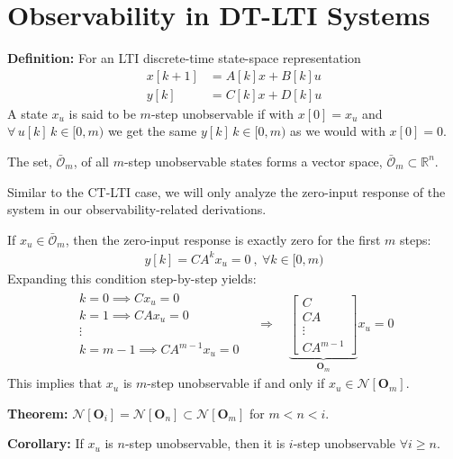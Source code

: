 \documentclass[twoside]{article}
\begin{document}
\section{Observability in DT-LTI Systems}

\textbf{Definition:} For an LTI discrete-time state-space representation
%
\begin{align*}
  x[k+1] &= A[k] x + B[k] u
\\
  y[k] &= C[k] x + D[k] u
\end{align*}
%
A state $x_u$ is said to be $m$-step unobservable 
if with $x[0] = x_u$ and $\forall \, u[k] \, k \in [0,m)$ we get the same $y[k] \, k \in [0,m)$ as we would with $x[0] = 0$. 

The set, $\bar{\mathcal{O}}_m$, of all $m$-step unobservable states forms a vector space, $\bar{\mathcal{O}}_m \subset 
\mathbb{R}^n$.

Similar to the CT-LTI case, we will only analyze the zero-input response of the system in our 
observability-related derivations. 

If $x_u \in \bar{\mathcal{O}}_m$, then the zero-input response is exactly zero for the first $m$ steps:
%
\begin{align*}
    y[k] = C A^k x_u = 0 \ , \ \forall k \in [0,m)
\end{align*}
%
Expanding this condition step-by-step yields:
%
\begin{align*}
    \begin{array}{c} 
        k = 0 \implies C x_u = 0 \\
        k = 1 \implies C A x_u = 0 \\
        \vdots \\
        k = m-1 \implies C A^{m-1} x_u = 0
    \end{array}
    \quad \Rightarrow \quad
    \underbrace{\begin{bmatrix} C \\ C A \\ \vdots \\ C A^{m-1} \end{bmatrix}}_{\mathbf{O}_m} x_u = 0
\end{align*}
%
This implies that $x_u$ is $m$-step unobservable if and only if
$x_u \in \mathcal{N}[ \mathbf{O}_m ]$.

\textbf{Theorem:} $\mathcal{N}[ \mathbf{O}_i ] = \mathcal{N}[ \mathbf{O}_n ] \subset \mathcal{N}[ \mathbf{O}_m ]$ for $m < n < i$.

\textbf{Corollary:} If $x_u$ is $n$-step unobservable, then it is $i$-step unobservable $\forall i \ge n$.
\end{document}
